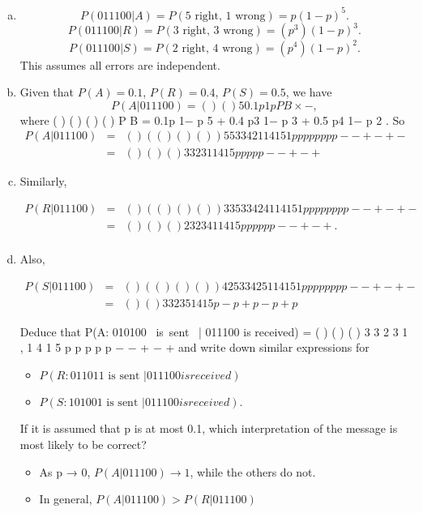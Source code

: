 \documentclass[a4paper,12pt]{article}
\begin{document}
\begin{enumerate}[(a)]
\item 
\[P(011100|A) = P(\mbox{5 right, 1 wrong}) = p(1− p)^5 .\]
\[P(011100|R) = P(\mbox{3 right, 3 wrong}) = (p^3)(1− p)^3 .\]
\[P(011100|S) = P(\mbox{2 right, 4 wrong}) = (p^4)(1− p)^2 .\]
This assumes all errors are independent.
\item Given that $P(A) = 0.1$, $P(R) = 0.4$, $P(S) = 0.5$, we have 
\[P(A|011100) = ( )
( )
5 0.1 p 1 p
P B
× −
,\]
where ( ) ( ) ( ) ( ) P B = 0.1p 1− p 5 + 0.4 p3 1− p 3 + 0.5 p4 1− p 2 .
So
\begin{eqnarray*}
P(A|011100) &=& ( )
( ( ) ( ) ( ) )
5
5 3 3 4 2
1
1 4 1 5 1
p p
p p p p p p
−
− + − + −
\\ &=&  ( )
( ) ( )
3
3 2 3
1
1 4 1 5
p
p p p p
−
− + − +
\end{eqnarray*}
\item Similarly, 

\begin{eqnarray*}
P(R|011100) &=& ( )
( ( ) ( ) ( ) )
3 3
5 3 3 4 2
4 1
1 4 1 5 1
p p
p p p p p p
−
− + − + −
\\ &=& ( )
( ) ( )
2
3 2 3
4 1
1 4 1 5
p p
p p p p
−
− + − +
.\\
\end{eqnarray*}
\item Also, 

\begin{eqnarray*}
P(S|011100) &=& ( )
( ( ) ( ) ( ) )
4 2
5 3 3 4 2
5 1
1 4 1 5 1
p p
p p p p p p
−
− + − + −
\\&=&
( ) ( )
3
3 2 3
5
1 4 1 5
p
− p + p − p + p
\end{eqnarray*}
\begin{framed}
Deduce that
P(A: 010100 \mbox{ is sent } | 011100 is received) = ( )
( ) ( )
3
3 2 3
1
,
1 4 1 5
p
p p p p
−
− + − +
and write down similar expressions for
\begin{itemize}
    \item $P(R: 011011 \mbox{ is sent } | 011100 is received)$

\item $P(S: 101001 \mbox{ is sent } | 011100 is received)$.
\end{itemize}


If it is assumed that p is at most 0.1, which interpretation of the message is most
likely to be correct?

\end{framed}

\begin{itemize}
\item As p → 0, $P(A|011100) \rightarrow 1$, while the others do not.
\item In general, $P(A|011100) > P(R|011100)$ 


\end{itemize}
\end{enumerate}
\end{document}
